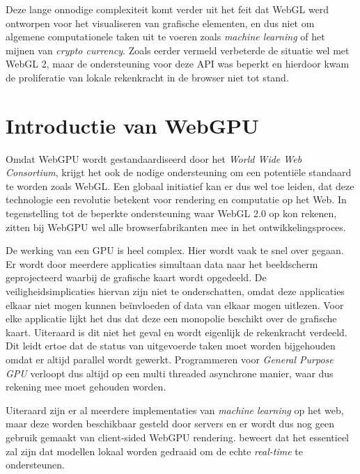 \bigbreak{}

Deze lange onnodige complexiteit komt verder uit het feit dat WebGL werd ontworpen voor het visualiseren van grafische elementen, en dus niet om algemene computationele taken uit te voeren zoals \textit{machine learning} of het mijnen van \textit{crypto currency}. Zoals eerder vermeld verbeterde de situatie wel met WebGL 2, maar de ondersteuning voor deze API was beperkt en hierdoor kwam de proliferatie van lokale rekenkracht in de browser niet tot stand.

\section{Introductie van WebGPU}

Omdat WebGPU wordt gestandaardiseerd door het \textit{World Wide Web Consortium}, krijgt het ook de nodige ondersteuning om een potentiële standaard te worden zoals WebGL. Een globaal initiatief kan er dus wel toe leiden, dat deze technologie een revolutie betekent voor rendering en computatie op het Web. In tegenstelling tot de beperkte ondersteuning waar WebGL 2.0 op kon rekenen, zitten bij WebGPU wel alle browserfabrikanten mee in het ontwikkelingsproces. \autocite{Surma2022}

\bigbreak{}

De werking van een GPU is heel complex. Hier wordt vaak te snel over gegaan. Er wordt door meerdere applicaties simultaan data naar het beeldscherm geprojecteerd waarbij de grafische kaart wordt opgedeeld. De veiligheidsimplicaties hiervan zijn niet te onderschatten, omdat deze applicaties elkaar niet mogen kunnen beïnvloeden of data van elkaar mogen uitlezen. Voor elke applicatie lijkt het dus dat deze een monopolie beschikt over de grafische kaart. Uiteraard is dit niet het geval en wordt eigenlijk de rekenkracht verdeeld. Dit leidt ertoe dat de status van uitgevoerde taken moet worden bijgehouden omdat er altijd parallel wordt gewerkt. Programmeren voor \textit{General Purpose GPU} verloopt dus altijd op een multi threaded asynchrone manier, waar dus rekening mee moet gehouden worden. \autocite{Surma2022}

\bigbreak{}

Uiteraard zijn er al meerdere implementaties van \textit{machine learning} op het web, maar deze worden beschikbaar gesteld door servers en er wordt dus nog geen gebruik gemaakt van client-sided WebGPU rendering. \textcite{Fleetwood2023a} beweert dat het essentieel zal zijn dat modellen lokaal worden gedraaid om de echte \textit{real-time} te ondersteunen.

